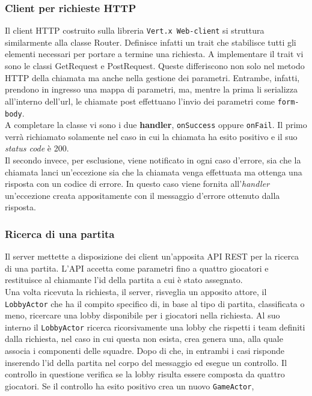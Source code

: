 	\subsubsection{Client per richieste HTTP}
	  Il client HTTP costruito sulla libreria \texttt{Vert.x Web-client} si struttura similarmente alla classe Router. Definisce infatti un trait che stabilisce tutti gli elementi necessari per portare a termine una richiesta.
	  A implementare il trait vi sono le classi GetRequest e PostRequest. Queste differiscono non solo nel metodo HTTP della chiamata ma anche nella gestione dei parametri. Entrambe, infatti, prendono in ingresso una mappa di parametri, ma, mentre la prima li serializza all'interno dell'url, le chiamate post effettuano l'invio dei parametri come \texttt{form-body}.\\
	  A completare la classe vi sono i due \textbf{handler}, \texttt{onSuccess} oppure \texttt{onFail}. Il primo verrà richiamato solamente nel caso in cui la chiamata ha esito positivo e il suo \textit{status code} è 200. \\
	  Il secondo invece, per esclusione, viene notificato in ogni caso d'errore, sia che la chiamata lanci un'eccezione sia che la chiamata venga effettuata ma ottenga una risposta con un codice di errore. In questo caso viene fornita all'\textit{handler} un'eccezione creata appositamente con il messaggio d'errore ottenuto dalla risposta.

        \subsubsection{Ricerca di una partita}
          Il server mettette a disposizione dei client un'apposita API REST per la ricerca di una partita. L'API accetta come parametri fino a quattro giocatori e restituisce al chiamante l'id della partita a cui è stato assegnato.
          \\
          Una volta ricevuta la richiesta, il server, risveglia un apposito attore, il \texttt{LobbyActor} che ha il compito specifico di, in base al tipo di partita, classificata o meno, ricercare una lobby disponibile per i giocatori nella richiesta. Al suo interno il \texttt{LobbyActor} ricerca ricorsivamente una lobby che rispetti i team definiti dalla richiesta, nel caso in cui questa non esista, crea genera una, alla quale associa i componenti delle squadre. Dopo di che, in entrambi i casi risponde inserendo l'id della partita nel corpo del messaggio ed esegue un controllo. Il controllo in questione verifica se la lobby risulta essere composta da quattro giocatori. Se il controllo ha esito positivo crea un nuovo \texttt{GameActor},

